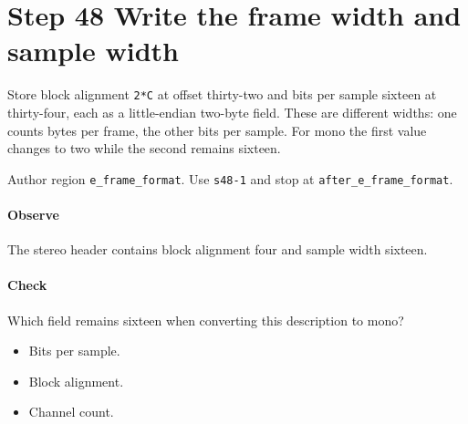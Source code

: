 \section{Step 48 Write the frame width and sample width}\label{pcm-wav-s48}
Store block alignment \texttt{2*C} at offset thirty-two and bits per sample sixteen at thirty-four, each as a little-endian two-byte field. These are different widths: one counts bytes per frame, the other bits per sample. For mono the first value changes to two while the second remains sixteen.

Author region \texttt{e\_frame\_format}. Use \texttt{s48-1} and stop at \texttt{after\_e\_frame\_format}.

\paragraph{Observe} The stereo header contains block alignment four and sample width sixteen.

\paragraph{Check} Which field remains sixteen when converting this description to mono?
\begin{itemize}
\item[A.] Bits per sample.
\item[B.] Block alignment.
\item[C.] Channel count.
\end{itemize}
